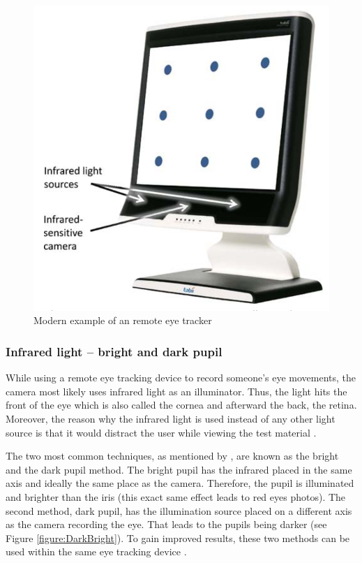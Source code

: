 \begin{figure}[!ht]
    \centering
    \includegraphics[width=0.75\linewidth]{images/remote_biedert2010eyebook.png}
    \caption{
        Modern example of an remote eye tracker \autocite[274]{biedert2010eyebook}
    }
    \label{figure:Remote}
\end{figure}

\subsubsection{Infrared light -- bright and dark pupil}
While using a remote eye tracking device to record someone's eye movements, the camera most likely uses infrared light as an illuminator. Thus, the light hits the front of the eye which is also called the cornea and afterward the back, the retina. 
Moreover, the reason why the infrared light is used instead of any other light source is that it would distract the user while viewing the test material \autocite[]{poole2006eye, biedert2010eyebook}.

The two most common techniques, as mentioned by \textcite[]{goldberg2003eye}, are known as the bright and the dark pupil method. The bright pupil has the infrared placed in the same axis and ideally the same place as the camera. Therefore, the pupil is illuminated and brighter than the iris (this exact same effect leads to red eyes photos). The second method, dark pupil, has the illumination source placed on a different axis as the camera recording the eye. That leads to the pupils being darker (see Figure \ref{figure:DarkBright}). To gain improved results, these two methods can be used within the same eye tracking device \autocite[]{tobii2018dark, goldberg2003eye}. 

